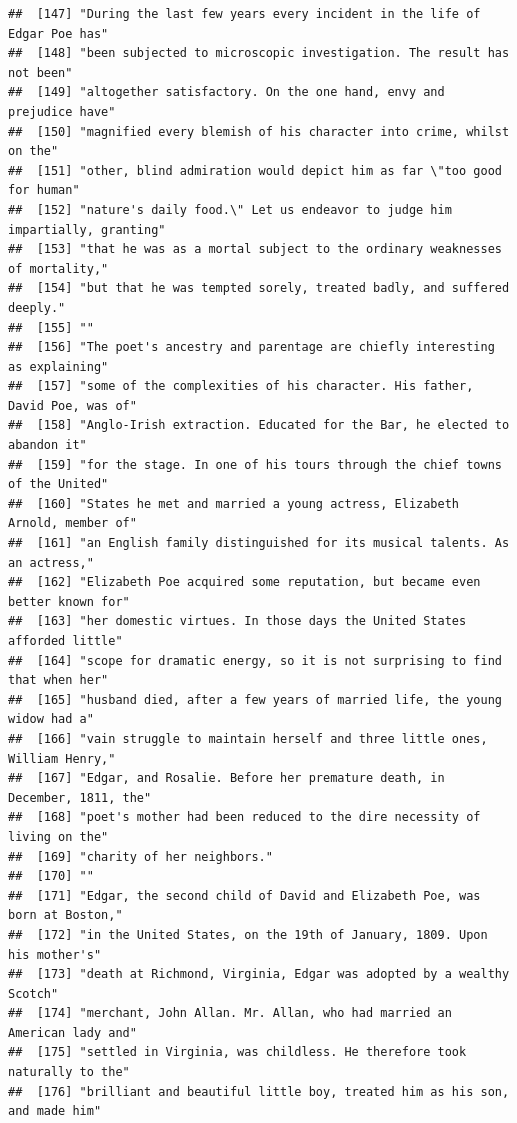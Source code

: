 \documentclass{article}\usepackage[]{graphicx}\usepackage[]{color}
\makeatletter
\newenvironment{kframe}{%
 \def\at@end@of@kframe{}%
 \ifinner\ifhmode%
  \def\at@end@of@kframe{\end{minipage}}%
  \begin{minipage}{\columnwidth}%
 \fi\fi%
 \def\FrameCommand##1{\hskip\@totalleftmargin \hskip-\fboxsep
 \colorbox{shadecolor}{##1}\hskip-\fboxsep
     \hskip-\linewidth \hskip-\@totalleftmargin \hskip\columnwidth}%
 \MakeFramed {\advance\hsize-\width
   \@totalleftmargin\z@ \linewidth\hsize
   \@setminipage}}%
 {\par\unskip\endMakeFramed%
 \at@end@of@kframe}
\newenvironment{knitrout}{}{} %
\makeatother
\begin{document}
\begin{knitrout}
\begin{kframe}
\begin{verbatim}
##  [147] "During the last few years every incident in the life of Edgar Poe has"       
##  [148] "been subjected to microscopic investigation. The result has not been"        
##  [149] "altogether satisfactory. On the one hand, envy and prejudice have"           
##  [150] "magnified every blemish of his character into crime, whilst on the"          
##  [151] "other, blind admiration would depict him as far \"too good for human"        
##  [152] "nature's daily food.\" Let us endeavor to judge him impartially, granting"   
##  [153] "that he was as a mortal subject to the ordinary weaknesses of mortality,"    
##  [154] "but that he was tempted sorely, treated badly, and suffered deeply."         
##  [155] ""                                                                            
##  [156] "The poet's ancestry and parentage are chiefly interesting as explaining"     
##  [157] "some of the complexities of his character. His father, David Poe, was of"    
##  [158] "Anglo-Irish extraction. Educated for the Bar, he elected to abandon it"      
##  [159] "for the stage. In one of his tours through the chief towns of the United"    
##  [160] "States he met and married a young actress, Elizabeth Arnold, member of"      
##  [161] "an English family distinguished for its musical talents. As an actress,"     
##  [162] "Elizabeth Poe acquired some reputation, but became even better known for"    
##  [163] "her domestic virtues. In those days the United States afforded little"       
##  [164] "scope for dramatic energy, so it is not surprising to find that when her"    
##  [165] "husband died, after a few years of married life, the young widow had a"      
##  [166] "vain struggle to maintain herself and three little ones, William Henry,"     
##  [167] "Edgar, and Rosalie. Before her premature death, in December, 1811, the"      
##  [168] "poet's mother had been reduced to the dire necessity of living on the"       
##  [169] "charity of her neighbors."                                                   
##  [170] ""                                                                            
##  [171] "Edgar, the second child of David and Elizabeth Poe, was born at Boston,"     
##  [172] "in the United States, on the 19th of January, 1809. Upon his mother's"       
##  [173] "death at Richmond, Virginia, Edgar was adopted by a wealthy Scotch"          
##  [174] "merchant, John Allan. Mr. Allan, who had married an American lady and"       
##  [175] "settled in Virginia, was childless. He therefore took naturally to the"      
##  [176] "brilliant and beautiful little boy, treated him as his son, and made him"    

\end{verbatim}
\end{kframe}
\end{knitrout}
\end{document}

